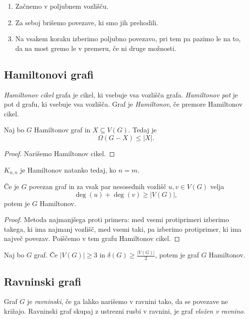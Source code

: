 \begin{enumerate}
    \item Začnemo v poljubnem vozlišču.
    \item Za seboj brišemo povezave, ki smo jih prehodili.
    \item Na vsakem koraku izberimo poljubno povezavo, pri tem pa pazimo le na to, da na most gremo le v premeru, če ni druge možnosti.
\end{enumerate}

\subsection{Hamiltonovi grafi}
\begin{definicija}
    \emph{Hamiltonov cikel} grafa je cikel, ki vsebuje vsa vozlišča grafa. \emph{Hamiltonov pot} je pot d grafu, ki vsebuje vsa vozlišča. Graf je \emph{Hamiltonov}, če premore Hamiltonov cikel.
\end{definicija}

\begin{izrek}
    Naj bo $G$ Hamiltonov graf in $X \subseteq V(G)$. Tedaj je $$\Omega(G-X) \leq |X|.$$
\end{izrek}

\begin{proof}
    Narišemo Hamiltonov cikel.
\end{proof}

\begin{primer}
    $K_{n,n}$ je Hamiltonov natanko tedaj, ko $n=m$.
\end{primer}

\begin{izrek}[Ore]
    Če je $G$ povezan graf in za vsak par nesosednih vozlišč $u, v \in V(G)$ velja $$\deg(u)+\deg(v) \geq |V(G)|,$$ potem je $G$ Hamiltonov.
\end{izrek}

\begin{proof}
    Metoda najmanjšega proti primera: med vsemi protiprimeri izberimo takega, ki ima najmanj vozlišč, med vsemi taki, pa izberimo protiprimer, ki ima največ povezav. Poiščemo v tem grafu Hamiltonov cikel.
\end{proof}

\begin{izrek}[Dirac]
    Naj bo $G$ graf. Če $|V(G)| \geq 3$ in $\delta(G) \geq \frac{|V(G)|}{2}$, potem je graf $G$ Hamiltonov.
\end{izrek}

\subsection{Ravninski grafi}
\begin{definicija}
    Graf $G$ je \emph{ravninski}, če ga lahko narišemo v ravnini tako, da se povezave ne križajo. Ravninski graf skupaj z ustrezni rusbi v ravnini, je graf \emph{vložen v ravnino}.
\end{definicija}

